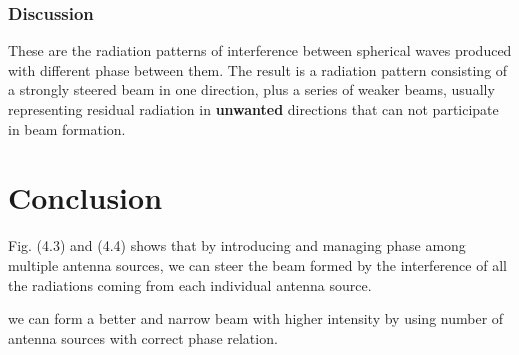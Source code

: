 \subsubsection{Discussion}

These are the radiation patterns of interference between spherical waves produced with different phase between them. The result is a radiation pattern consisting of a strongly steered beam in one direction, plus a series of weaker beams, usually representing residual radiation in \textbf{unwanted} directions that can not participate in beam formation.

\section{Conclusion}
Fig. (4.3) and (4.4) shows that by introducing and managing phase among multiple antenna sources, we can steer the beam formed by the interference of all the radiations coming from each individual antenna source.

we can form a better and narrow beam with higher intensity by using number of antenna sources with correct phase relation.
